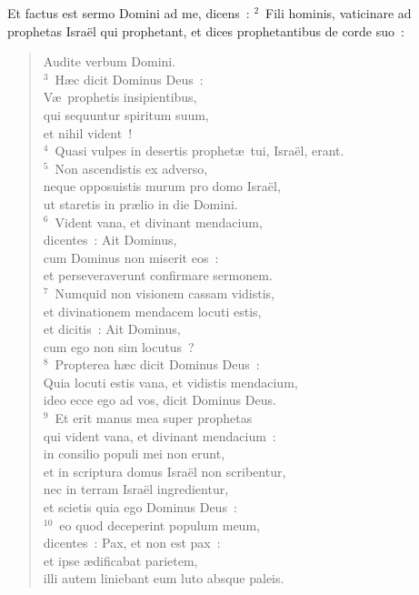 \lettrine[lines=10,image=true,loversize=0.05,lraise=-0.03]{E}{}t factus est sermo Domini ad me, dicens~:
${}^{2}$~Fili hominis, vaticinare ad prophetas Isra\"el qui prophetant, et dices prophetantibus de corde suo~: \begin{flushleft}\begin{verse}Audite verbum Domini.\\
${}^{3}$~H\ae c dicit Dominus Deus~:\\ V\ae\ prophetis insipientibus,\\ qui sequuntur spiritum suum,\\ et nihil vident~!\\
${}^{4}$~Quasi vulpes in desertis prophet\ae\ tui, Isra\"el, erant.\\
${}^{5}$~Non ascendistis ex adverso,\\ neque opposuistis murum pro domo Isra\"el,\\ ut staretis in pr\ae lio in die Domini.\\
${}^{6}$~Vident vana, et divinant mendacium,\\ dicentes~: Ait Dominus,\\ cum Dominus non miserit eos~:\\ et perseveraverunt confirmare sermonem.\\
${}^{7}$~Numquid non visionem cassam vidistis,\\ et divinationem mendacem locuti estis,\\ et dicitis~: Ait Dominus,\\ cum ego non sim locutus~?\\
${}^{8}$~Propterea h\ae c dicit Dominus Deus~:\\ Quia locuti estis vana, et vidistis mendacium,\\ ideo ecce ego ad vos, dicit Dominus Deus.\\
${}^{9}$~Et erit manus mea super prophetas\\ qui vident vana, et divinant mendacium~:\\ in consilio populi mei non erunt,\\ et in scriptura domus Isra\"el non scribentur,\\ nec in terram Isra\"el ingredientur,\\ et scietis quia ego Dominus Deus~:\\
${}^{10}$~eo quod deceperint populum meum,\\ dicentes~: Pax, et non est pax~:\\ et ipse \ae dificabat parietem,\\ illi autem liniebant eum luto absque paleis.\\

\end{verse}
\end{flushleft}
